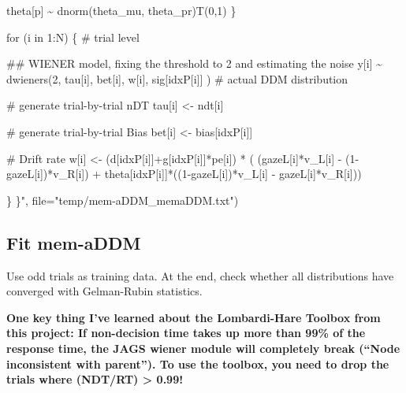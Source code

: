 \documentclass[
]{book}
\newenvironment{Shaded}{\begin{snugshade}}{\end{snugshade}}
\newcommand{\AttributeTok}[1]{\textcolor[rgb]{0.13,0.29,0.53}{#1}}
\newcommand{\NormalTok}[1]{#1}
\newcommand{\StringTok}[1]{\textcolor[rgb]{0.31,0.60,0.02}{#1}}
\begin{document}
\begin{Shaded}
\begin{Highlighting}[]
\StringTok{        theta[p] \textasciitilde{} dnorm(theta\_mu, theta\_pr)T(0,1)}
\StringTok{    \}}

\StringTok{    for (i in 1:N) \{ \# trial level}

\StringTok{    \#\# WIENER model, fixing the threshold to 2 and estimating the noise}
\StringTok{        y[i] \textasciitilde{} dwieners(2, tau[i], bet[i], w[i], sig[idxP[i]] ) \# actual DDM distribution}

\StringTok{        \# generate trial{-}by{-}trial nDT}
\StringTok{        tau[i] \textless{}{-} ndt[i]}

\StringTok{        \# generate trial{-}by{-}trial Bias}
\StringTok{        bet[i] \textless{}{-} bias[idxP[i]]}

\StringTok{        \# Drift rate}
\StringTok{        w[i] \textless{}{-} (d[idxP[i]]+g[idxP[i]]*pe[i]) * ( (gazeL[i]*v\_L[i] {-} (1{-}gazeL[i])*v\_R[i]) + theta[idxP[i]]*((1{-}gazeL[i])*v\_L[i] {-} gazeL[i]*v\_R[i]))}

\StringTok{    \}}
\StringTok{\}"}\NormalTok{, }\AttributeTok{file=}\StringTok{"temp/mem{-}aDDM\_memaDDM.txt"}\NormalTok{)}
\end{Highlighting}
\end{Shaded}

\hypertarget{fit-mem-addm}{%
\subsection{Fit mem-aDDM}\label{fit-mem-addm}}

Use odd trials as training data. At the end, check whether all distributions have converged with Gelman-Rubin statistics.

\textbf{One key thing I've learned about the Lombardi-Hare Toolbox from this project: If non-decision time takes up more than 99\% of the response time, the JAGS wiener module will completely break (``Node inconsistent with parent''). To use the toolbox, you need to drop the trials where (NDT/RT) \textgreater{} 0.99!}
\end{document}
